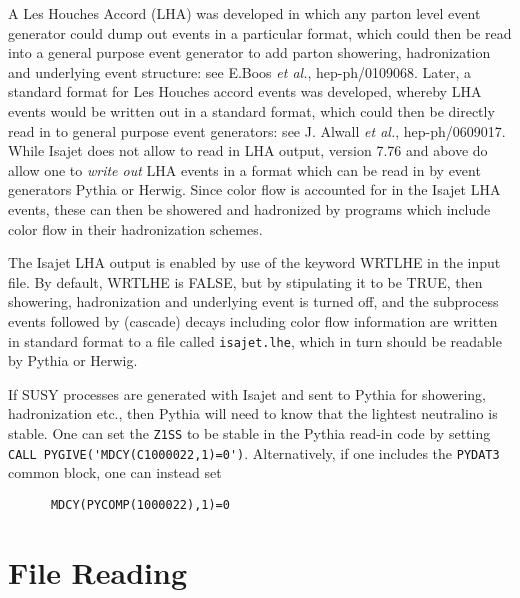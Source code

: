 A Les Houches Accord (LHA) was developed in which any parton level 
event generator could dump out events in a particular format, which could 
then be read into a general purpose event generator to add 
parton showering, hadronization and underlying event structure:
see E.Boos {\it et al.}, hep-ph/0109068. 
Later, a standard format for Les Houches accord events was developed,
whereby LHA events would be written out in a standard format, 
which could then be directly read in to general purpose event generators:
see J. Alwall {\it et al.}, hep-ph/0609017.
While Isajet does not allow to read in LHA output, version 7.76 and above 
do allow one to {\it write out} LHA events in a format which can be read in by
event generators Pythia or Herwig. Since color flow is accounted for in the
Isajet LHA events, these can then be showered and hadronized by programs
which include color flow in their hadronization schemes.

The Isajet LHA output is enabled by use of the keyword WRTLHE in the 
input file. By default, WRTLHE is FALSE, but by stipulating it to be TRUE,
then showering, hadronization and underlying event is turned off, 
and the subprocess events followed by (cascade) decays 
including color flow information are written in standard format to a 
file called \verb|isajet.lhe|, which in turn should be readable by Pythia 
or Herwig.

If SUSY processes are generated with Isajet and sent to Pythia 
for showering, hadronization etc., then Pythia will need to know 
that the lightest neutralino is stable. One can set the \verb|Z1SS|
to be stable in the Pythia read-in code by setting
\verb|CALL PYGIVE('MDCY(C1000022,1)=0')|. 
Alternatively, if one includes the
\verb|PYDAT3| common block, one can instead set 
\begin{verbatim}
      MDCY(PYCOMP(1000022),1)=0 
\end{verbatim}

\newpage
\section{File Reading\label{TAPE}}

